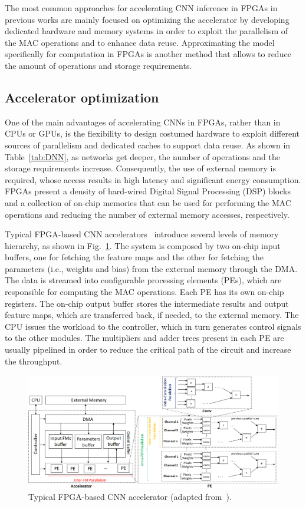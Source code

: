The most common approaches for accelerating CNN inference in FPGAs in previous works are mainly focused on optimizing the accelerator by developing dedicated hardware and memory systems in order to exploit the parallelism of the MAC operations and to enhance data reuse. Approximating the model specifically for computation in FPGAs is another method that allows to reduce the amount of operations and storage requirements.

\subsection{Accelerator optimization}
\label{subsection:acc_opt}

One of the main advantages of accelerating CNNs in FPGAs, rather than in CPUs or GPUs, is the flexibility to design costumed hardware to exploit different sources of parallelism and dedicated caches to support data reuse. As shown in Table~\ref{tab:DNN}, as networks get deeper, the number of operations and the storage requirements increase. Consequently, the use of external memory is required, whose access results in high latency and significant energy consumption. FPGAs present a density of hard-wired Digital Signal Processing (DSP) blocks and a collection of on-chip memories that can be used for performing the MAC operations and reducing the number of external memory accesses, respectively.

Typical FPGA-based CNN accelerators~\cite{qiu:fpga_acc, zhang:fpga_acc, suda:fpga_acc} introduce several levels of memory hierarchy, as shown in Fig.~\ref{fig:fpga_cnn}. The system is composed by two on-chip input buffers, one for fetching the feature maps and the other for fetching the parameters (i.e., weights and bias) from the external memory through the DMA. The data is streamed into configurable processing elements (PEs), which are responsible for computing the MAC operations. Each PE has its own on-chip registers. The on-chip output buffer stores the intermediate results and output feature maps, which are transferred back, if needed, to the external memory. The CPU issues the workload to the controller, which in turn generates control signals to the other modules. The multipliers and adder trees present in each PE are usually pipelined in order to reduce the critical path of the circuit and increase the throughput.

\begin{figure}[!htb]
  \centering
  \includegraphics[width=\textwidth]{Figures/fpga_cnn.png}
  \caption{Typical FPGA-based CNN accelerator (adapted from~\cite{Abdelouahab:dnn_survey}).}
  \label{fig:fpga_cnn}
\end{figure}

